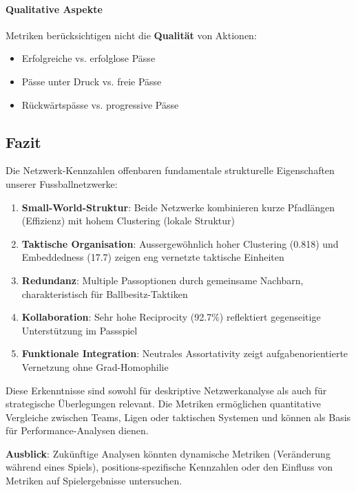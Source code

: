 \paragraph{Qualitative Aspekte}
Metriken berücksichtigen nicht die \textbf{Qualität} von Aktionen:
\begin{itemize}
  \item Erfolgreiche vs. erfolglose Pässe
  \item Pässe unter Druck vs. freie Pässe
  \item Rückwärtspässe vs. progressive Pässe
\end{itemize}

\subsection{Fazit}

Die Netzwerk-Kennzahlen offenbaren fundamentale strukturelle Eigenschaften unserer Fussballnetzwerke:

\begin{enumerate}
  \item \textbf{Small-World-Struktur}: Beide Netzwerke kombinieren kurze Pfadlängen (Effizienz) mit hohem Clustering (lokale Struktur)
  \item \textbf{Taktische Organisation}: Aussergewöhnlich hoher Clustering (0.818) und Embeddedness (17.7) zeigen eng vernetzte taktische Einheiten
  \item \textbf{Redundanz}: Multiple Passoptionen durch gemeinsame Nachbarn, charakteristisch für Ballbesitz-Taktiken
  \item \textbf{Kollaboration}: Sehr hohe Reciprocity (92.7\%) reflektiert gegenseitige Unterstützung im Passspiel
  \item \textbf{Funktionale Integration}: Neutrales Assortativity zeigt aufgabenorientierte Vernetzung ohne Grad-Homophilie
\end{enumerate}

Diese Erkenntnisse sind sowohl für deskriptive Netzwerkanalyse als auch für strategische Überlegungen relevant. Die Metriken ermöglichen quantitative Vergleiche zwischen Teams, Ligen oder taktischen Systemen und können als Basis für Performance-Analysen dienen.

\textbf{Ausblick}: Zukünftige Analysen könnten dynamische Metriken (Veränderung während eines Spiels), positions-spezifische Kennzahlen oder den Einfluss von Metriken auf Spielergebnisse untersuchen.
